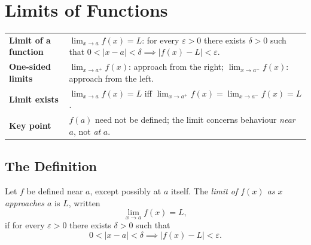 
\section{Limits of Functions}

\begin{tcolorbox}[colback=gray!6, colframe=gray!40, arc=2pt,
  left=6pt, right=6pt, top=4pt, bottom=4pt,
  title={\small\textbf{Limits --- Quick Reference}},
  fonttitle=\small\bfseries]
\begin{tabular}{@{}p{}p{}@{}}
\textbf{Limit of a function} & $\lim_{x \to a} f(x) = L$: for every $\varepsilon > 0$ there exists $\delta > 0$ such that $0 < |x-a| < \delta \implies |f(x) - L| < \varepsilon$. \\[4pt]
\textbf{One-sided limits}    & $\lim_{x \to a^+} f(x)$: approach from the right; $\lim_{x \to a^-} f(x)$: approach from the left. \\[4pt]
\textbf{Limit exists}        & $\lim_{x \to a} f(x) = L$ iff $\lim_{x \to a^+} f(x) = \lim_{x \to a^-} f(x) = L$. \\[4pt]
\textbf{Key point}           & $f(a)$ need not be defined; the limit concerns behaviour \emph{near} $a$, not \emph{at} $a$. \\
\end{tabular}
\end{tcolorbox}

\subsection{The Definition}

\begin{tcolorbox}[colback=propbox, colframe=propborder, arc=2pt,
  left=6pt, right=6pt, top=4pt, bottom=4pt,
  title={\small\textbf{Definition (Limit of a Function)}},
  fonttitle=\small\bfseries]
Let $f$ be defined near $a$, except possibly at $a$ itself.
The \emph{limit of $f(x)$ as $x$ approaches $a$} is $L$, written
\[
  \lim_{x \to a} f(x) = L,
\]
if for every $\varepsilon > 0$ there exists $\delta > 0$ such that
\[
  0 < |x - a| < \delta \implies |f(x) - L| < \varepsilon.
\]
\end{tcolorbox}


